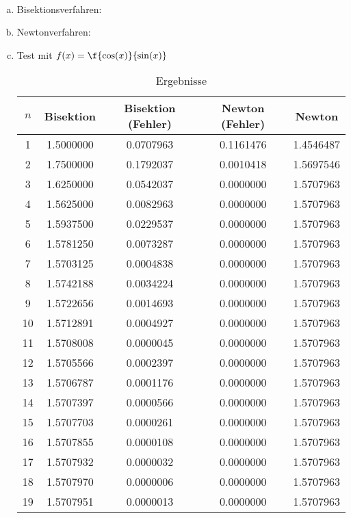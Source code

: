 \documentclass[a4paper]{scrartcl}
\begin{document}
\begin{aufgabe}~

	\begin{enumerate}[a)]
		\item
			Bisektionsverfahren:
			
		\item
			Newtonverfahren:
			
		\item
			Test mit $f(x) = \f{\cos(x)}{\sin(x)}$
			
			\begin{table}[h]
				\centering
				\caption{Ergebnisse}
				\begin{tabular}{c|c|c|c|c}
					$n$ & Bisektion & Bisektion (Fehler) & Newton (Fehler) & Newton \\ \hline
1 & 1.5000000 & 0.0707963 & 0.1161476 & 1.4546487\\
2 & 1.7500000 & 0.1792037 & 0.0010418 & 1.5697546\\
3 & 1.6250000 & 0.0542037 & 0.0000000 & 1.5707963\\
4 & 1.5625000 & 0.0082963 & 0.0000000 & 1.5707963\\
5 & 1.5937500 & 0.0229537 & 0.0000000 & 1.5707963\\
6 & 1.5781250 & 0.0073287 & 0.0000000 & 1.5707963\\
7 & 1.5703125 & 0.0004838 & 0.0000000 & 1.5707963\\
8 & 1.5742188 & 0.0034224 & 0.0000000 & 1.5707963\\
9 & 1.5722656 & 0.0014693 & 0.0000000 & 1.5707963\\
10 & 1.5712891 & 0.0004927 & 0.0000000 & 1.5707963\\
11 & 1.5708008 & 0.0000045 & 0.0000000 & 1.5707963\\
12 & 1.5705566 & 0.0002397 & 0.0000000 & 1.5707963\\
13 & 1.5706787 & 0.0001176 & 0.0000000 & 1.5707963\\
14 & 1.5707397 & 0.0000566 & 0.0000000 & 1.5707963\\
15 & 1.5707703 & 0.0000261 & 0.0000000 & 1.5707963\\
16 & 1.5707855 & 0.0000108 & 0.0000000 & 1.5707963\\
17 & 1.5707932 & 0.0000032 & 0.0000000 & 1.5707963\\
18 & 1.5707970 & 0.0000006 & 0.0000000 & 1.5707963\\
19 & 1.5707951 & 0.0000013 & 0.0000000 & 1.5707963\\

\end{tabular}
\end{table}
\end{enumerate}
\end{aufgabe}
\end{document}
